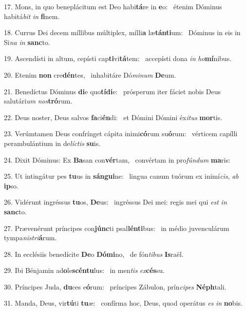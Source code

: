 17. Mons, in quo beneplácitum est Deo habi\textbf{tá}re in \textbf{e}o: \ast\  étenim Dóminus habitá\textit{bit} \textit{in} \textbf{fi}nem.\

18. Currus Dei decem míllibus múltiplex, mílli\textbf{a} læ\textbf{tán}\textbf{ti}um: \ast\  Dóminus in eis in Si\textit{na} \textit{in} \textbf{sanc}to.\

19. Ascendísti in altum, cepísti cap\textbf{ti}vi\textbf{tá}tem: \ast\  accepísti dona \textit{in} \textit{ho}\textbf{mí}nibus.\

20. Etenim \textbf{non} cre\textbf{dén}tes, \ast\  inhabitáre Dó\textit{mi}\textit{num} \textbf{De}um.\

21. Benedíctus Dóminus \textbf{di}e quo\textbf{tí}\textbf{di}e: \ast\  prósperum iter fáciet nobis Deus salutári\textit{um} \textit{nos}\textbf{tró}rum.\

22. Deus noster, Deus salvos \textbf{fa}ci\textbf{én}di: \ast\  et Dómini Dómini éx\textit{i}\textit{tus} \textbf{mor}tis.\

23. Verúmtamen Deus confrínget cápita inimi\textbf{có}rum su\textbf{ó}rum: \ast\  vérticem capílli perambulántium in de\textit{líc}\textit{tis} \textbf{su}is.\

24. Dixit Dóminus: Ex \textbf{Ba}san con\textbf{vér}tam, \ast\  convértam in pro\textit{fún}\textit{dum} \textbf{ma}ris:\

25. Ut intingátur pes \textbf{tu}us in \textbf{sán}\textbf{gui}ne: \ast\  lingua canum tuórum ex inimí\textit{cis}, \textit{ab} \textbf{ip}so.\

26. Vidérunt ingréssus \textbf{tu}os, \textbf{De}us: \ast\  ingréssus Dei mei: regis mei qui \textit{est} \textit{in} \textbf{sanc}to.\

27. Prævenérunt príncipes con\textbf{júnc}ti psal\textbf{lén}\textbf{ti}bus: \ast\  in médio juvenculárum tympa\textit{nis}\textit{tri}\textbf{á}rum.\

28. In ecclésiis benedícite \textbf{De}o \textbf{Dó}\textbf{mi}no, \ast\  de fón\textit{ti}\textit{bus} \textbf{Is}raël.\

29. Ibi Bénjamin ad\textbf{o}le\textbf{scén}\textbf{tu}lus: \ast\  in men\textit{tis} \textit{ex}\textbf{cés}su.\

30. Príncipes Juda, \textbf{du}ces e\textbf{ó}rum: \ast\  príncipes Zábulon, prín\textit{ci}\textit{pes} \textbf{Néph}tali.\

31. Manda, Deus, vir\textbf{tú}ti \textbf{tu}æ: \ast\  confírma hoc, Deus, quod operátus \textit{es} \textit{in} \textbf{no}bis.\

